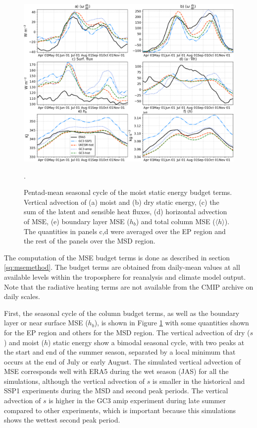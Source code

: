 \begin{figure}[t!]
\includegraphics[width=\linewidth]{figures/thermopentad}
\caption[Seasonal cycle of MSE budget terms]{Pentad-mean seasonal cycle of the moist static energy budget terms. Vertical advection of (a) moist and (b) dry static energy, (c) the sum of the latent and sensible heat fluxes, (d) horizontal advection of MSE, (e) boundary layer MSE ($h_b$) and total column MSE ($\langle h \rangle$). The quantities in panels c,d were averaged over the EP region and the rest of the panels over the MSD region. }. 
\label{fig:thermo_pentad}
\end{figure}



 The computation of the MSE budget terms is done as described in section \ref{sq:msemethod}. The budget terms are obtained from daily-mean values at all available levels within the troposphere for reanalysis and climate model output. Note that the radiative heating terms are not available from the CMIP archive on daily scales. %
 
  First, the seasonal cycle of the column budget terms, as well as the boundary layer or near surface MSE ($h_b$), is shown in Figure \ref{fig:thermo_pentad} with some quantities shown for the EP region and others for the MSD region. The vertical advection of dry ($s$) and moist ($h$) static energy show a bimodal seasonal cycle, with two peaks at the start and end of the summer season, separated by a local minimum that occurs at the end of July or early August.
 The simulated vertical advection of MSE corresponds well with ERA5 during the wet season (JAS) for all the simulations, although the vertical advection of $s$ is smaller in the historical and SSP1 experiments during the MSD and second peak periods. The vertical advection of $s$ is higher in the GC3 amip experiment during late summer compared to other experiments, which is important because this simulations shows the wettest second peak period. 

